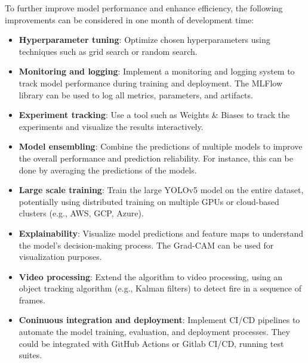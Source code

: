 \documentclass{article}
\begin{document}
To further improve model performance and enhance efficiency, the following improvements can be considered in one month of development time:

\begin{itemize}
    \item \textbf{Hyperparameter tuning}: Optimize chosen hyperparameters using techniques such as grid search or random search.
    \item \textbf{Monitoring and logging}: Implement a monitoring and logging system to track model performance during training and deployment. The MLFlow library can be used to log all metrics, parameters, and artifacts.
    \item \textbf{Experiment tracking}: Use a tool such as Weights \& Biases to track the experiments and visualize the results interactively.
    \item \textbf{Model ensembling}: Combine the predictions of multiple models to improve the overall performance and prediction reliability.  For instance, this can be done by averaging the predictions of the models.
    \item \textbf{Large scale training}: Train the large YOLOv5 model on the entire dataset, potentially using distributed training on multiple GPUs or cloud-based clusters (e.g., AWS, GCP, Azure).
    \item \textbf{Explainability}: Visualize model predictions and feature maps to understand the model's decision-making process. The Grad-CAM can be used for visualization purposes.
    \item \textbf{Video processing}: Extend the algorithm to video processing, using an object tracking algorithm (e.g., Kalman filters) to detect fire in a sequence of frames.
    \item \textbf{Coninuous integration and deployment}: Implement CI/CD pipelines to automate the model training, evaluation, and deployment processes. They could be integrated with GitHub Actions or Gitlab CI/CD, running test suites.
\end{itemize}
\end{document}
